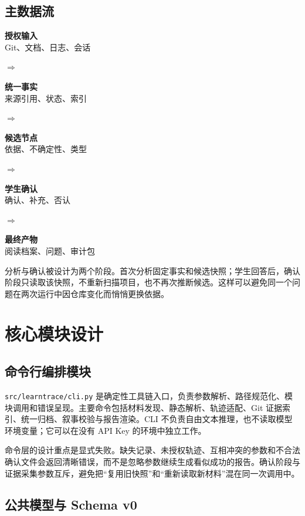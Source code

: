 \documentclass[UTF8,a4paper,12pt]{ctexart}
\renewcommand{\arraystretch}{1.35}
\begin{document}
\subsection{主数据流}

\begin{center}
\renewcommand{\arraystretch}{1.55}
\small
\colorbox{LearnTraceLight}{\parbox{0.16\textwidth}{\centering\textbf{授权输入}\\Git、文档、日志、会话}}
$\Rightarrow$
\colorbox{LearnTraceLight}{\parbox{0.16\textwidth}{\centering\textbf{统一事实}\\来源引用、状态、索引}}
$\Rightarrow$
\colorbox{LearnTraceLight}{\parbox{0.16\textwidth}{\centering\textbf{候选节点}\\依据、不确定性、类型}}
$\Rightarrow$
\colorbox{LearnTraceLight}{\parbox{0.16\textwidth}{\centering\textbf{学生确认}\\确认、补充、否认}}
$\Rightarrow$
\colorbox{LearnTraceLight}{\parbox{0.16\textwidth}{\centering\textbf{最终产物}\\阅读档案、问题、审计包}}
\end{center}

分析与确认被设计为两个阶段。首次分析固定事实和候选快照；学生回答后，确认阶段只读取该快照，不重新扫描项目，也不再次推断候选。这样可以避免同一个问题在两次运行中因仓库变化而悄悄更换依据。

\section{核心模块设计}

\subsection{命令行编排模块}

\texttt{src/learntrace/cli.py} 是确定性工具链入口，负责参数解析、路径规范化、模块调用和错误呈现。主要命令包括材料发现、静态解析、轨迹适配、Git 证据索引、统一归档、叙事校验与报告渲染。CLI 不负责自由文本推理，也不读取模型环境变量；它可以在没有 API Key 的环境中独立工作。

命令层的设计重点是显式失败。缺失记录、未授权轨迹、互相冲突的参数和不合法确认文件会返回清晰错误，而不是忽略参数继续生成看似成功的报告。确认阶段与证据采集参数互斥，避免把“复用旧快照”和“重新读取新材料”混在同一次调用中。

\subsection{公共模型与 Schema v0}
\end{document}
